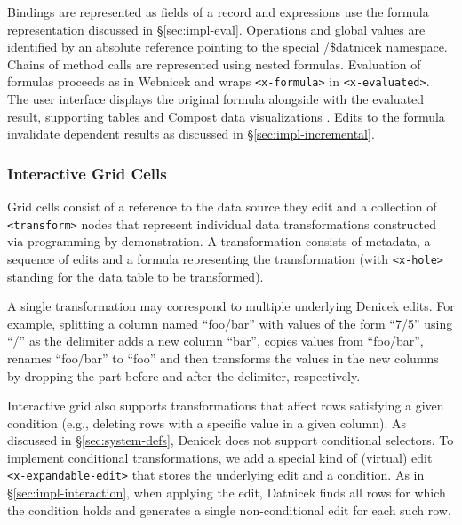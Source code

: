 \documentclass[sigconf]{acmart}
\newcommand{\ident}[1]{{\sffamily #1}}
\begin{document}
Bindings are represented as fields of a record and expressions use the formula representation
discussed in \S\ref{sec:impl-eval}. Operations and global values are identified by an absolute
reference pointing to the special \ident{/\$datnicek} namespace. Chains of method calls are
represented using nested formulas. Evaluation of formulas proceeds as in Webnicek
and wraps {\small\Verb_<x-formula>_} in {\small\Verb_<x-evaluated>_}.
The user interface displays the original formula alongside with the evaluated result, supporting
tables and Compost data visualizations \cite{petricek-2021-compost}. Edits to the formula
invalidate dependent results as discussed in \S\ref{sec:impl-incremental}.

\subsubsection*{Interactive Grid Cells}
Grid cells consist of a reference to the data source they edit and a collection of
{\small\Verb_<transform>_} nodes that represent individual data transformations constructed via
programming by demonstration. A transformation consists of metadata,
a sequence of edits and a formula representing the transformation (with {\small\Verb_<x-hole>_}
standing for the data table to be transformed).

A single transformation may correspond to multiple underlying Denicek edits. For example, splitting a
column named ``foo/bar'' with values of the form ``7/5'' using ``/'' as the delimiter adds a new column ``bar'', copies values from
``foo/bar'', renames ``foo/bar'' to ``foo'' and then transforms the values in the new columns
by dropping the part before and after the delimiter, respectively.

Interactive grid also supports transformations that affect rows satisfying a given
condition (e.g., deleting rows with a specific value in a given column). As discussed
in \S\ref{sec:system-defs}, Denicek does not support conditional selectors.
To implement conditional transformations, we add a special kind of (virtual) edit
{\small\Verb_<x-expandable-edit>_} that stores the underlying edit and a condition.
As in \S\ref{sec:impl-interaction}, when applying the edit, Datnicek finds all rows for which the
condition holds and generates a single non-conditional edit for each such row.


\end{document}
